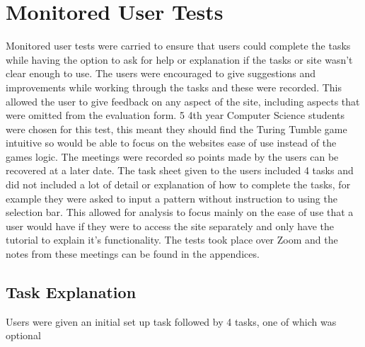 \documentclass{l4proj}
\begin{document}
\section{Monitored User Tests}
Monitored user tests were carried to ensure that users could complete the tasks while having the option to ask for help or explanation if the tasks or site wasn't clear enough to use. The users were encouraged to give suggestions and improvements while working through the tasks and these were recorded. This allowed the user to give feedback on any aspect of the site, including aspects that were omitted from the evaluation form. 5 4th year Computer Science students were chosen for this test, this meant they should find the Turing Tumble game intuitive so would be able to focus on the websites ease of use instead of the games logic. The meetings were recorded so points made by the users can be recovered at a later date. The task sheet given to the users included 4 tasks and did not included a lot of detail or explanation of how to complete the tasks, for example they were asked to input a pattern without instruction to using the selection bar. This allowed for analysis to focus mainly on the ease of use that a user would have if they were to access the site separately and only have the tutorial to explain it's functionality. The tests took place over Zoom and the notes from these meetings can be found in the appendices.

\subsection{Task Explanation}
\label{taskExplanation}
Users were given an initial set up task followed by 4 tasks, one of which was optional
\end{document}
